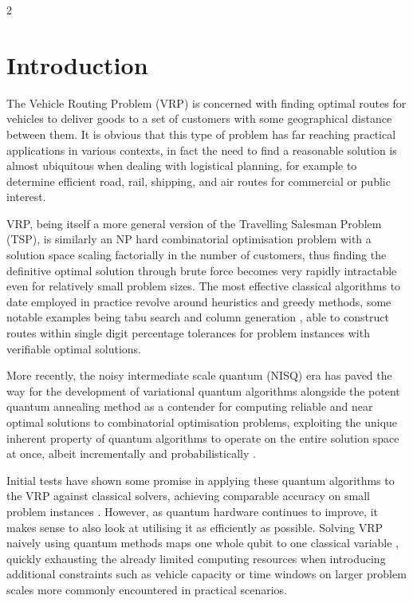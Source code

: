 \documentclass [10pt]{article}
\begin{document}
\begin {multicols}{2}

%

\section {Introduction}
The Vehicle Routing Problem (VRP) is concerned with finding optimal routes
for vehicles to deliver goods to a set of customers with some geographical
distance between them. It is obvious that this type of problem has far
reaching practical applications in various contexts, in fact the need to find
a reasonable solution is almost ubiquitous when dealing with logistical
planning, for example to determine efficient road, rail, shipping, and air
routes for commercial or public interest.

VRP, being itself a more general version of the Travelling Salesman Problem
(TSP), is similarly an NP hard \cite{vrp} combinatorial optimisation problem
with a solution space scaling factorially in the number of customers, thus
finding the definitive optimal solution through brute force becomes very
rapidly intractable even for relatively small problem sizes. The most
effective classical algorithms to date employed in practice revolve around
heuristics and greedy methods, some notable examples being tabu search
\cite{tabusearch} and column generation \cite{colgen}, able to construct
routes within single digit percentage tolerances \cite{metaheuristic} for
problem instances with verifiable optimal solutions.

More recently, the noisy intermediate scale quantum (NISQ) era \cite{nisq} has
paved the way for the development of variational quantum algorithms alongside
the potent quantum annealing \cite{annealintro} method as a contender for
computing reliable and near optimal solutions to combinatorial optimisation
problems, exploiting the unique inherent property of quantum algorithms to
operate on the entire solution space at once, albeit incrementally and
probabilistically \cite{qcintro}.

Initial tests have shown some promise in applying these quantum algorithms
to the VRP against classical solvers, achieving comparable accuracy on
small problem instances \cite{cvrpanneal} \cite{effvrp}.
However, as quantum hardware continues to improve, it makes
sense to also look at utilising it as efficiently as possible. Solving VRP
naively using quantum methods maps one whole qubit to one classical variable
\cite{effvrp},
quickly exhausting the already limited computing resources when introducing
additional constraints such as vehicle capacity or time windows on larger
problem scales more commonly encountered in practical scenarios.


\end{multicols}
\end{document}
